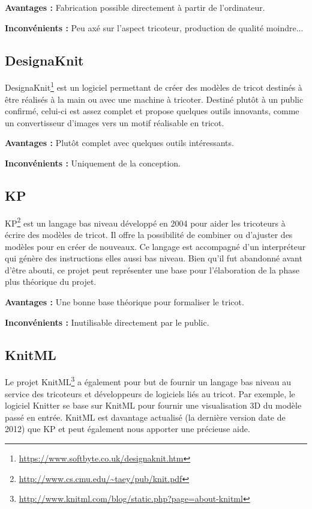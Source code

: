 \documentclass{article}
\begin{document}
\textbf{Avantages : } Fabrication possible directement à partir de l'ordinateur.

\textbf{Inconvénients : } Peu axé sur l'aspect tricoteur, production de qualité moindre...

\subsection{DesignaKnit}

DesignaKnit\footnote{\url{https://www.softbyte.co.uk/designaknit.htm}} est un logiciel permettant de créer des modèles de tricot destinés 
à être réalisés à la main ou avec une machine à tricoter. Destiné plutôt à un public confirmé, celui-ci est assez complet et propose 
quelques outils innovants, comme un convertisseur d'images vers un motif réalisable en tricot.

\textbf{Avantages : } Plutôt complet avec quelques outils intéressants.

\textbf{Inconvénients : } Uniquement de la conception.

\subsection{KP}

KP\footnote{\url{http://www.cs.cmu.edu/~taey/pub/knit.pdf}} est un langage bas niveau développé en 2004 pour aider les tricoteurs à écrire 
des modèles de tricot. Il offre la possibilité de combiner ou d'ajuster des modèles pour en créer de nouveaux. Ce langage est accompagné 
d'un interpréteur qui génère des instructions elles aussi bas niveau. Bien qu'il fut abandonné avant d'être abouti, ce projet peut 
représenter une base pour l'élaboration de la phase plus théorique du projet.


\textbf{Avantages : } Une bonne base théorique pour formaliser le tricot.

\textbf{Inconvénients : } Inutilisable directement par le public.

\subsection{KnitML}

Le projet KnitML\footnote{\url{http://www.knitml.com/blog/static.php?page=about-knitml}} a également pour but de fournir un langage bas 
niveau au service des tricoteurs et développeurs de logiciels liés au tricot. Par exemple, le logiciel Knitter se base sur KnitML pour 
fournir une visualisation 3D du modèle passé en entrée. KnitML est davantage actualisé (la dernière version date de 2012) que KP et peut 
également nous apporter une précieuse aide.
\end{document}
